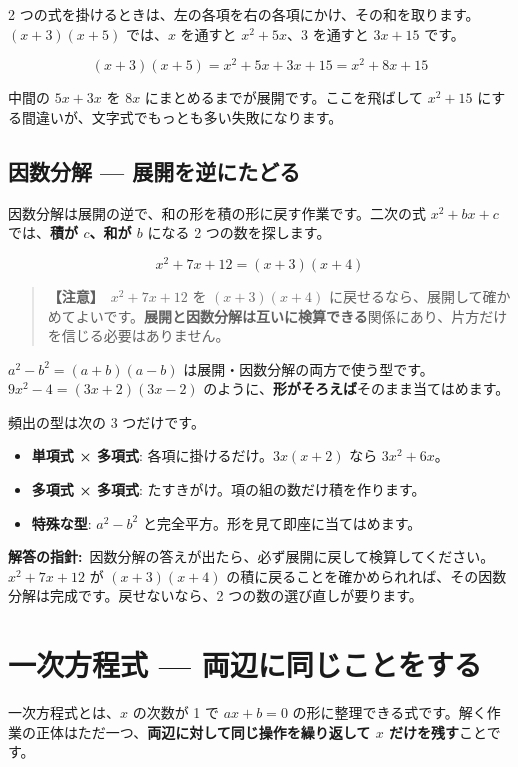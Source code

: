 \documentclass{article}
\begin{document}
2 つの式を掛けるときは、左の各項を右の各項にかけ、その和を取ります。\((x + 3)(x + 5)\) では、\(x\) を通すと \(x^2 + 5x\)、3 を通すと \(3x + 15\) です。

\[ (x + 3)(x + 5) = x^2 + 5x + 3x + 15 = x^2 + 8x + 15 \]

中間の \(5x + 3x\) を \(8x\) にまとめるまでが展開です。ここを飛ばして \(x^2 + 15\) にする間違いが、文字式でもっとも多い失敗になります。

\subsection{因数分解 — 展開を逆にたどる}

因数分解は展開の逆で、和の形を積の形に戻す作業です。二次の式 \(x^2 + bx + c\) では、\textbf{積が \(c\)、和が \(b\)} になる 2 つの数を探します。

\[ x^2 + 7x + 12 = (x + 3)(x + 4) \]

\begin{quote}
\textbf{【注意】}\ \(x^2 + 7x + 12\) を \((x + 3)(x + 4)\) に戻せるなら、展開して確かめてよいです。\textbf{展開と因数分解は互いに検算できる}関係にあり、片方だけを信じる必要はありません。
\end{quote}

\(a^2 - b^2 = (a + b)(a - b)\) は展開・因数分解の両方で使う型です。\(9x^2 - 4 = (3x + 2)(3x - 2)\) のように、\textbf{形がそろえば}そのまま当てはめます。

頻出の型は次の 3 つだけです。

\begin{itemize}
\item \textbf{単項式 × 多項式}: 各項に掛けるだけ。\(3x(x + 2)\) なら \(3x^2 + 6x\)。
\item \textbf{多項式 × 多項式}: たすきがけ。項の組の数だけ積を作ります。
\item \textbf{特殊な型}: \(a^2 - b^2\) と完全平方。形を見て即座に当てはめます。
\end{itemize}

\textbf{解答の指針:}\ 因数分解の答えが出たら、必ず展開に戻して検算してください。\(x^2 + 7x + 12\) が \((x+3)(x+4)\) の積に戻ることを確かめられれば、その因数分解は完成です。戻せないなら、2 つの数の選び直しが要ります。

\section{一次方程式 — 両辺に同じことをする}

一次方程式とは、\(x\) の次数が 1 で \(ax + b = 0\) の形に整理できる式です。解く作業の正体はただ一つ、\textbf{両辺に対して同じ操作を繰り返して \(x\) だけを残す}ことです。
\end{document}
